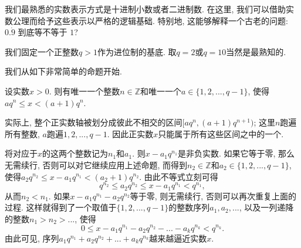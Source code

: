 

我们最熟悉的实数表示方式是十进制小数或者二进制数. 在这里, 我们可以借助实数公理而给予这些表示以严格的逻辑基础. 特别地, 这能够解释一个古老的问题: $0.\dot{9}$ 到底等不等于 $1$?

我们固定一个正整数$q>1$作为进位制的基底. 取$q=2$或$q=10$当然是最熟知的.

我们从如下非常简单的命题开始. 
\begin{lemma}{}
设实数$x>0$. 则有唯一一个整数$n\in\mathbb{Z}$和唯一一个$a\in\{1,2,...,q-1\}$, 使得$aq^n\leq x<(a+1)q^{n}$.
\end{lemma}

实际上, 整个正实数轴被划分成彼此不相交的区间$[aq^n,(a+1)q^{n+1})$; 这里$n$跑遍所有整数, $a$跑遍$1,2,...,q-1$. 因此正实数$x$只能属于所有这些区间之中的一个. 

将对应于$x$的这两个整数记为$n_1$和$a_1$. 则$x-a_1q^{n_1}$是非负实数. 如果它等于零, 那么无需续行, 否则可以对它继续应用上述命题, 而得到$n_2\in\mathbb{Z}$和$a_2\in\{1,2,...,q-1\}$, 使得$a_2q^{n_2}\leq x-a_1q^{n_1}<(a_2+1)q^{n_2}$. 由此不等式立刻可得
\[
q^{n_2}\leq a_2q^{n_2}\leq x-a_1q^{n_1}<q^{n_1},
\]
从而$n_2<n_1$. 如果$x-a_1q^{n_1}-a_2q^{n_2}$等于零, 则无需续行, 否则可以再次重复上面的过程. 这样就得到了一个取值于$\{1,2,...,q-1\}$的整数序列$a_1,a_2,...$, 以及一列递降的整数$n_1>n_2>...$, 使得
\[ 
0\leq x-a_1q^{n_1}-a_2q^{n_2}-...-a_kq^{n_k}<q^{n_k}.
\]
由此可见, 序列$a_1q^{n_1}+a_2q^{n_2}+...+a_kq^{n_k}$越来越逼近实数$x$. 